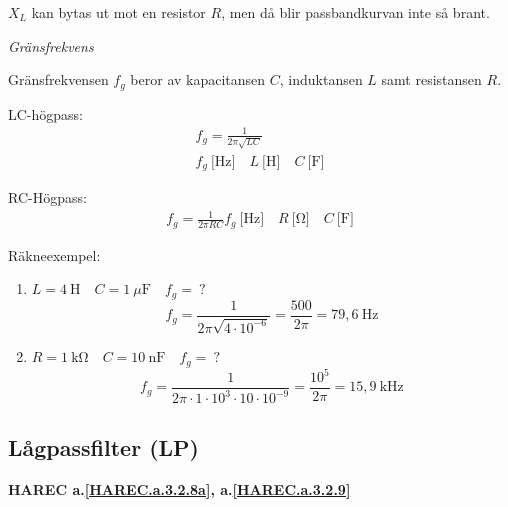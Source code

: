 \(X_L\) kan bytas ut mot en resistor \(R\), men då blir passbandkurvan inte så
brant.

\emph{Gränsfrekvens}

Gränsfrekvensen \(f_g\) beror av kapacitansen \(C\), induktansen \(L\) samt
resistansen \(R\).

LC-högpass:
\begin{gather*}
  f_g = \frac{1}{2π\sqrt{LC}} \\
  f_g\ \text{[Hz]} \quad L\ \text{[H]} \quad C\ \text{[F]}
\end{gather*}

RC-Högpass:
\begin{gather*}
  f_g = \frac{1}{2πRC}
  f_g\ \text{[Hz]} \quad R\ \text{[Ω]} \quad C\ \text{[F]}
\end{gather*}

Räkneexempel:
\begin{enumerate}
\item \(L = 4\ \text{H} \quad C = 1\ \mu\text{F} \quad f_g =\ ?\)
  \[
  f_g = \frac{1}{2π\sqrt{4 \cdot 10^{-6}}} = \frac{500}{2π}
  = 79,6\ \text{Hz}
  \]
\item \(R = 1\ \text{kΩ} \quad C = 10\ \text{nF} \quad f_g =\ ?\)
  \[
    f_g = \frac{1}{2π \cdot 1 \cdot 10^3 \cdot 10 \cdot 10^{-9}}
    = \frac{10^5}{2π} = 15,9\ \text{kHz}
  \]
\end{enumerate}

\subsection{Lågpassfilter (LP)}
\textbf{HAREC
  a.\ref{HAREC.a.3.2.8a}\label{myHAREC.a.3.2.8a},
  a.\ref{HAREC.a.3.2.9}\label{myHAREC.a.3.2.9b}
}

